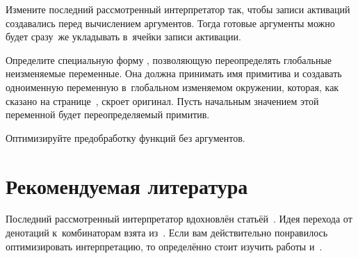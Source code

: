 \begin{exercise}\label{fast/ex:act-rec-before}
Измените последний рассмотренный интерпретатор так, чтобы записи активаций
создавались перед вычислением аргументов. Тогда готовые аргументы можно будет
сразу~же укладывать в~ячейки записи активации.
\end{exercise}

\begin{exercise}\label{fast/ex:redefine}
Определите специальную форму , позволяющую переопределять
глобальные неизменяемые переменные. Она должна принимать имя примитива и
создавать одноименную переменную в~глобальном изменяемом окружении, которая,
как сказано на странице~\pageref{fast/fast/classify/par:redefine}, скроет
оригинал. Пусть начальным значением этой переменной будет переопределяемый
примитив.
\end{exercise}

\begin{exercise}\label{fast/ex:boost-thunks}
Оптимизируйте предобработку функций без аргументов.
\end{exercise}


\section*{Рекомендуемая литература}\label{fast/sect:recommended-reading}

Последний рассмотренный интерпретатор вдохновлён статьёй~\cite{fl87}. Идея
перехода от денотаций к~комбинаторам взята из~\cite{cli84}. Если вам
действительно понравилось оптимизировать интерпретацию, то определённо стоит
изучить работы \cite{cha80} и~\cite{sj93}.

